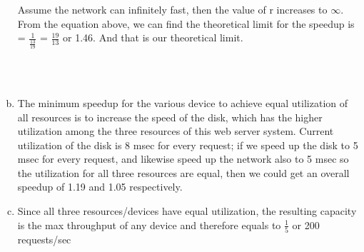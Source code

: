 \documentclass{article}   	                         %
\begin{document}
\begin{enumerate}[(a)]
Assume the network can infinitely fast, then the value of r increases to $\infty$. From the equation above, we can find the theoretical limit for the speedup is = $\frac{1}{\frac{13}{19}}$  = $\frac{19}{13}$ or 1.46. And that is our theoretical limit.\\
\\
\\
\item
The minimum speedup for the various device to achieve equal utilization of all resources is to increase the speed of the disk, which has the higher utilization among the three resources of this web server system. Current utilization of the disk is 8 msec for every request; if we speed up the disk to 5 msec for every request, and likewise speed up the network also to 5 msec so the utilization for all three resources are equal, then we could get an overall speedup of 1.19 and 1.05 respectively.
\item
Since all three resources/devices have equal utilization, the resulting capacity is the max throughput of any device and therefore equals to $\frac{1}{5}$ or 200 requests/sec
\end{enumerate}
\end{document}

